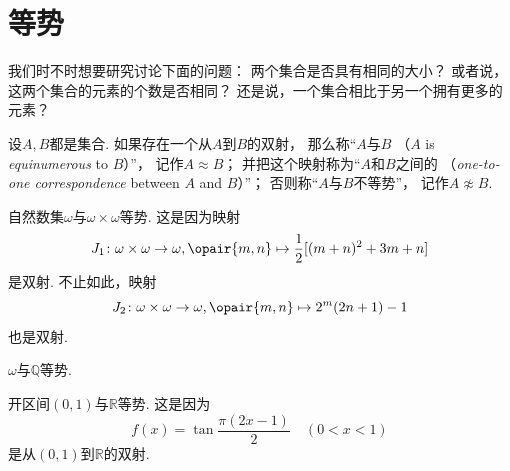 \section{等势}
我们时不时想要研究讨论下面的问题：
两个集合是否具有相同的大小？
或者说，这两个集合的元素的个数是否相同？
还是说，一个集合相比于另一个拥有更多的元素？

\begin{definition}\label{definition:基数.等势的定义}
设\(A,B\)都是集合.
如果存在一个从\(A\)到\(B\)的双射，
那么称“\(A\)与\(B\) （\(A\) is \emph{equinumerous} to \(B\)）”，
记作\(A \approx B\)；
并把这个映射称为“\(A\)和\(B\)之间的%
（\emph{one-to-one correspondence} between \(A\) and \(B\)）”；
否则称“\(A\)与\(B\)不等势”，
记作\(A \napprox B\).
\end{definition}

\begin{example}
自然数集\(\omega\)与\(\omega\times\omega\)等势.
这是因为映射\begin{equation*}
	J_1\colon \omega\times\omega\to\omega,
	\opair{m,n} \mapsto \frac12[(m+n)^2+3m+n]
\end{equation*}是双射.
不止如此，映射\begin{equation*}
	J_2\colon \omega\times\omega\to\omega,
	\opair{m,n} \mapsto 2^m(2n+1)-1
\end{equation*}也是双射.
\end{example}

\begin{example}
\(\omega\)与\(\mathbb{Q}\)等势.
\end{example}

\begin{example}\label{example:基数.开区间与全体实数等势1}
开区间\((0,1)\)与\(\mathbb{R}\)等势.
这是因为\begin{equation*}
	f(x) = \tan\frac{\pi(2x-1)}2
	\quad(0<x<1)
\end{equation*}是从\((0,1)\)到\(\mathbb{R}\)的双射.
\end{example}

